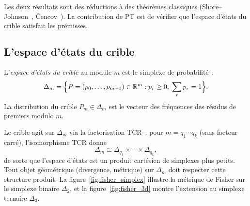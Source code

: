 \documentclass[12pt,a4paper]{article}
\begin{document}
Les deux résultats sont des réductions à des théorèmes classiques
(Shore--Johnson~\cite{ShoreJohnson1980},
\v{C}encov~\cite{Cencov1982}). La contribution de PT est de vérifier
que l'espace d'états du crible satisfait les prémisses.

\subsection{L'espace d'états du crible}
\label{sec:ch5_state_space}

\begin{definition}
\label{def:simplex}
L'\emph{espace d'états du crible} au module $m$ est le simplexe de
probabilité~:
\[
  \Delta_m = \Bigl\{ P = (p_0, \ldots, p_{m-1}) \in \mathbb{R}^m
             : p_r \geq 0,\; \sum_r p_r = 1 \Bigr\}.
\]
La distribution du crible $P_m \in \Delta_m$ est le vecteur des
fréquences des résidus de premiers modulo $m$.
\end{definition}

Le crible agit sur $\Delta_m$ via la factorisation TCR~:
pour $m = q_1 \cdots q_k$ (sans facteur carré), l'isomorphisme TCR donne
\[
  \Delta_m \cong \Delta_{q_1} \times \cdots \times \Delta_{q_k},
\]
de sorte que l'espace d'états est un produit cartésien de simplexes
plus petits. Tout objet géométrique (divergence, métrique) sur
$\Delta_m$ doit respecter cette structure produit.
La figure~\ref{fig:fisher_simplex} illustre la métrique de Fisher sur
le simplexe binaire $\Delta_2$, et la
figure~\ref{fig:fisher_3d} montre l'extension au simplexe ternaire
$\Delta_3$.
\end{document}
